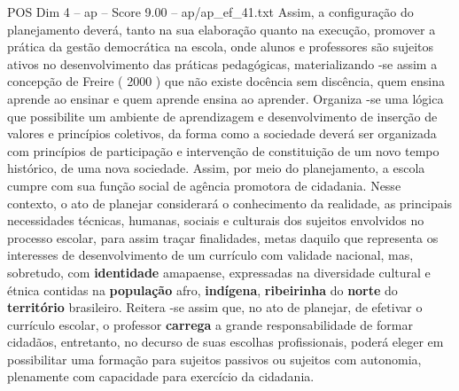 \begin{textsample}{POS Dim 4 – ap – Score 9.00 – ap/ap\_ef\_41.txt}
Assim, a configuração do planejamento deverá, tanto na sua elaboração quanto na execução, promover a prática da gestão democrática na escola, onde alunos e professores são sujeitos ativos no desenvolvimento das práticas pedagógicas, materializando -se assim a concepção de Freire ( 2000 ) que não existe docência sem discência, quem ensina aprende ao ensinar e quem aprende ensina ao aprender.
Organiza -se uma lógica que possibilite um ambiente de aprendizagem e desenvolvimento de inserção de valores e princípios coletivos, da forma como a sociedade deverá ser organizada com princípios de participação e intervenção de constituição de um novo tempo histórico, de uma nova sociedade.
Assim, por meio do planejamento, a escola cumpre com sua função social de agência promotora de cidadania.
Nesse contexto, o ato de planejar considerará o conhecimento da realidade, as principais necessidades técnicas, humanas, sociais e culturais dos sujeitos envolvidos no processo escolar, para assim traçar finalidades, metas daquilo que representa os interesses de desenvolvimento de um currículo com validade nacional, mas, sobretudo, com \textbf{identidade} amapaense, expressadas na diversidade cultural e étnica contidas na \textbf{população} afro, \textbf{indígena}, \textbf{ribeirinha} do \textbf{norte} do \textbf{território} brasileiro.
Reitera -se assim que, no ato de planejar, de efetivar o currículo escolar, o professor \textbf{carrega} a grande responsabilidade de formar cidadãos, entretanto, no decurso de suas escolhas profissionais, poderá eleger em possibilitar uma formação para sujeitos passivos ou sujeitos com autonomia, plenamente com capacidade para exercício da cidadania.

\end{textsample}

